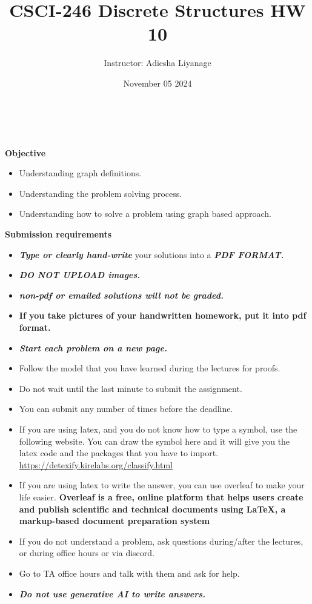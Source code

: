 \documentclass[12pt]{exam}
\title{CSCI-246 Discrete Structures HW 10}
\author{Instructor: Adiesha Liyanage}
\date{November 05 2024}
\begin{document}
\maketitle

\hrulefill
\\
\\
\textbf{Objective}
\begin{itemize}
    \item Understanding graph definitions.
    \item Understanding the problem solving process.
    \item Understanding how to solve a problem using graph based approach.
\end{itemize}

\textbf{Submission requirements}
\begin{itemize}
    \item \textbf{\textit{Type or clearly hand-write}} your solutions into a \textbf{\textit{PDF FORMAT.}} 
    \item \textbf{\textit{DO NOT UPLOAD images.}}
    \item \textbf{\textit{non-pdf or emailed solutions will not be graded.}}
    \item \textbf{If you take pictures of your handwritten homework, put it into pdf format.}
    \item \textbf{\textit{Start each problem on a new page.}}
    \item Follow the model that you have learned during the lectures for proofs.
    \item Do not wait until the last minute to submit the assignment.
    \item You can submit any number of times before the deadline. 
    \item If you are using latex, and you do not know how to type a symbol, use the following website. You can draw the symbol here and it will give you the latex code and the packages that you have to import. \url{https://detexify.kirelabs.org/classify.html}
    \item If you are using latex to write the answer, you can use overleaf to make your life easier. \textbf{Overleaf is a free, online platform that helps users create and publish scientific and technical documents using LaTeX, a markup-based document preparation system}
    \item If you do not understand a problem, ask questions during/after the lectures, or during office hours or via discord.
    \item Go to TA office hours and talk with them and ask for help.
    \item \textbf{\textit{Do not use generative AI to write answers.}} 
\end{itemize}
\end{document}
